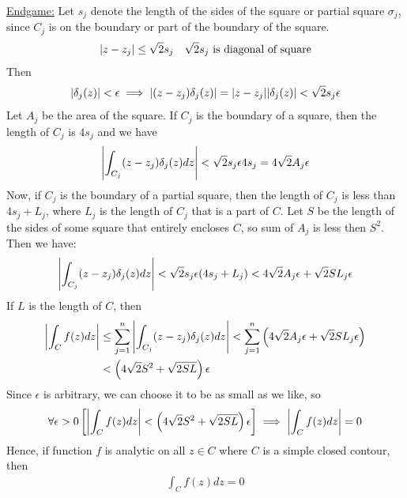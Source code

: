 \documentclass[12pt, english]{book}
\makeatletter
\renewenvironment{proof}[1][\proofname]{\par
	\pushQED{\qed}%
	\normalfont \topsep6\p@\@plus6\p@\relax
	\list{}{%
		\settowidth{\leftmargin}{\itshape\proofname:\hskip\labelsep}%
		\setlength{\labelwidth}{0pt}%
		\setlength{\itemindent}{-\leftmargin}%
	}%
	\item[\hskip\labelsep\itshape#1\@addpunct{:}]\ignorespaces
	}{ \popQED\endlist\@endpefalse}
\makeatother
\begin{document}
\begin{proof}
		\underline{Endgame:} \newline \newline
		Let \(s_j\) denote the length of the sides of the square or partial square \(\sigma_j\), since \(C_j\) is on the boundary or part of the boundary of the square.
		\begin{align*}
			\abs{z - z_j} &\leq \sqrt{2} s_j & \sqrt{2} s_j \text{ is diagonal of square}
		\end{align*}
		Then 
		\begin{align*}
			\abs{\delta_j(z)} < \epsilon 
			\implies \abs{(z - z_j) \delta_j(z)} = \abs{z - z_j} \abs{\delta_j(z)} < \sqrt{2} s_j \epsilon
		\end{align*}
		Let \(A_j\) be the area of the square. If \(C_j\) is the boundary of a square, then the length of \(C_j\) is \(4s_j\)  and we have
		\begin{align*}
			\abs{\int_{C_j} (z - z_j) \delta_j (z) dz} < \sqrt{2}s_j \epsilon 4 s_j = 4\sqrt{2} A_j \epsilon
		\end{align*}
		Now, if \(C_j\) is the boundary of a partial square, then the length of \(C_j\) is less than \(4s_j + L_j\), where \(L_j\) is the length of \(C_j\) that is a part of \(C\). Let \(S\) be the length of the sides of some square that entirely encloses \(C\), so sum of \(A_j\) is less then \(S^2\). Then we have: 
		\begin{align*}
			\abs{\int_{C_j} (z - z_j) \delta_j(z) dz} < \sqrt{2} s_j \epsilon (4s_j + L_j) < 4 \sqrt{2} A_j \epsilon + \sqrt{2} SL_j \epsilon
		\end{align*}
		If \(L\) is the length of \(C\), then
		\begin{align*}
			\abs{\int_{C} f(z) dz} 
			&\leq \sum_{j=1}^{n} \abs{\int_{C_j} (z - z_j) \delta_j (z) dz} 
			< \sum_{j=1}^{n} \left( 4 \sqrt{2} A_j \epsilon + \sqrt{2} SL_j \epsilon \right) \\
			&< \left(4 \sqrt{2} S^2 + \sqrt{2 SL} \right) \epsilon
		\end{align*}
		Since \(\epsilon\) is arbitrary, we can choose it to be as small as we like, so 
		\begin{align*}
			\forall \epsilon > 0
			\left[\abs{\int_{C} f(z) dz} < \left(4 \sqrt{2} S^2 + \sqrt{2 SL} \right) \epsilon \right] \implies \abs{\int_{C} f(z) dz} = 0
		\end{align*}
		Hence, if function \(f\) is analytic on all \(z \in C\) where \(C\) is a simple closed contour, then
		\begin{align*}
			\int_{C} f(z) dz = 0
		\end{align*}
	

\end{proof}
\end{document}
